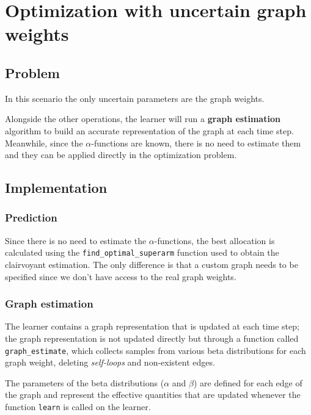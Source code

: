 \chapter{Optimization with uncertain graph weights}
\label{chap:unc_weights}

\section{Problem}

In this scenario the only uncertain parameters are the graph weights.

Alongside the other operations, the learner will run a \textbf{graph estimation} algorithm to build an accurate representation of the graph at each time step.
Meanwhile, since the $\alpha$-functions are known, there is no need to estimate them and they can be applied directly in the optimization problem.

\section{Implementation}

\subsection{Prediction}

Since there is no need to estimate the $\alpha$-functions, the best allocation is calculated using the \texttt{find\_optimal\_superarm} function used to obtain the clairvoyant estimation.
The only difference is that a custom graph needs to be specified since we don't have access to the real graph weights.

\subsection{Graph estimation}

The learner contains a graph representation that is updated at each time step; the graph representation is not updated directly but through a function called \texttt{graph\_estimate}, which collects samples from various beta distributions for each graph weight, deleting \textit{self-loops} and non-existent edges.

The parameters of the beta distributions ($\alpha$ and $\beta$) are defined for each edge of the graph and represent the effective quantities that are updated whenever the function \texttt{learn} is called on the learner.


